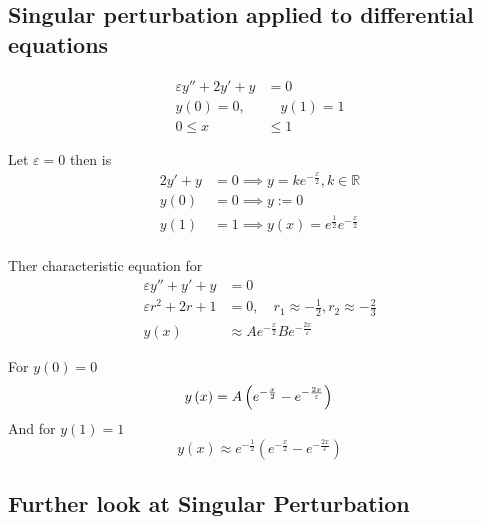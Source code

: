 \documentclass{article}
\theoremstyle{remark}
\begin{document}
\subsection{Singular perturbation applied to differential equations}%
\label{sub:singular_perturbation_applied_to_differential_equations}

\[
\begin{split}
  \varepsilon y'' + 2 y'  + y &= 0 \\
  y\left( 0 \right) = 0,  &  \quad y\left( 1 \right) = 1   \\
  0\le x  &  \le 1
\end{split} 
\] 

Let $\varepsilon  = 0$ then is \[
\begin{split}
2 y'  + y &= 0 \implies  y = k  e ^{ -\frac{x}{2}} , k \in  \mathbb{R}  \\
y\left( 0 \right) &= 0 \implies  y := 0 \\
y\left( 1 \right) &= 1 \implies  y\left( x \right) = e^{\frac{1}{2}} e^{-\frac{x}{2}} \\
\end{split} 
\] 

Ther characteristic equation for \[
  \begin{split}
\varepsilon y''  + y'  + y &=  0 \\
\varepsilon r ^2 + 2 r + 1 &=  0, \quad  r_{1} \approx -\frac{1}{2} , r_{2} \approx-\frac{2}{3}  \\
y\left( x \right)  &  \approx A e^{-\frac{x}{2}} B e^{ -\frac{2x}{\varepsilon }}
  \end{split} 
\] 


For $y\left( 0 \right) = 0$ \[
y\left( x \right) =  A \left( e ^{ -\frac{x}{2}} - e^{-\frac{2x}{\varepsilon }} \right) \\
\] 
And for $y\left( 1 \right)=1$ \[
y\left( x \right) \approx e^{-\frac{1}{2}} \left( e^{-\frac{x}{2}} - e ^{ -\frac{2x}{\varepsilon }} \right)
\] 



\subsection{Further look at Singular Perturbation}%
\label{sub:further_look_at_singular_perturbation}
\end{document}
